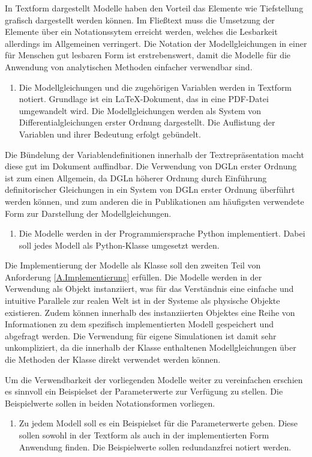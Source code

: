 In Textform dargestellt Modelle haben den Vorteil das Elemente wie Tiefstellung grafisch dargestellt werden können. Im Fließtext muss die Umsetzung der Elemente über ein Notationssytem erreicht werden, welches die Lesbarkeit allerdings im Allgemeinen verringert. Die Notation der Modellgleichungen in einer für Menschen gut lesbaren Form ist erstrebenswert, damit die Modelle für die Anwendung von analytischen Methoden einfacher verwendbar sind. 
\begin{enumerate}[resume*]
	\item \label{E.Textdok}Die Modellgleichungen und die zugehörigen Variablen werden in Textform notiert. Grundlage ist ein \LaTeX-Dokument, das in eine PDF-Datei umgewandelt wird. Die Modellgleichungen werden als System von Differentialgleichungen erster Ordnung dargestellt. Die Auflistung der Variablen und ihrer Bedeutung erfolgt gebündelt.
\end{enumerate}
Die Bündelung der Variablendefinitionen innerhalb der Textrepräsentation macht diese gut im Dokument auffindbar. Die Verwendung von DGLn erster Ordnung ist zum einen Allgemein, da DGLn höherer Ordnung durch Einführung definitorischer Gleichungen in ein System von DGLn erster Ordnung überführt werden können, und zum anderen die in Publikationen am häufigsten verwendete Form zur Darstellung der Modellgleichungen.

\begin{enumerate}[resume*]
	\item \label{E.Implementation}Die Modelle werden in der Programmiersprache Python implementiert. Dabei soll jedes Modell als Python-Klasse umgesetzt werden.
\end{enumerate}
Die Implementierung der Modelle als Klasse soll den zweiten Teil von Anforderung \ref{A.Implementierung} erfüllen. Die Modelle werden in der Verwendung als Objekt instanziiert, was für das Verständnis eine einfache und intuitive Parallele zur realen Welt ist in der Systeme als physische Objekte existieren. Zudem können innerhalb des instanziierten Objektes eine Reihe von Informationen zu dem spezifisch implementierten Modell gespeichert und abgefragt werden. Die Verwendung für eigene Simulationen ist damit sehr unkompliziert, da die innerhalb der Klasse enthaltenen Modellgleichungen über die Methoden der Klasse direkt verwendet werden können.

Um die Verwendbarkeit der vorliegenden Modelle weiter zu vereinfachen erschien es sinnvoll ein Beispielset der Parameterwerte zur Verfügung zu stellen. Die Beispielwerte sollen in beiden Notationsformen vorliegen.
\begin{enumerate}[resume*]
	\item \label{E.Parameterwerte}Zu jedem Modell soll es ein Beispielset für die Parameterwerte geben. Diese sollen sowohl in der Textform als auch in der implementierten Form Anwendung finden. Die Beispielwerte sollen redundanzfrei notiert werden.
\end{enumerate}

